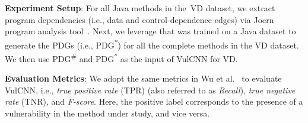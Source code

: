 {\bf Experiment Setup}: For all Java methods in the~VD dataset, we
extract program dependencies (i.e., data and control-dependence edges)
via Joern program analysis tool~\cite{joern-2014}. Next, we leverage
\tool that was trained on a Java dataset
to generate the PDGs (i.e., PDG\textsuperscript{*}) for all the
complete methods in the VD dataset. We then use
PDG\textsuperscript{\#} and PDG\textsuperscript{*} as the input of
VulCNN for VD.

{\bf Evaluation Metrics}: We adopt the same metrics in Wu et
al.~\cite{wu2022vulcnn} to evaluate VulCNN, i.e., \textit{true
  positive rate} (TPR) (also referred to as \textit{Recall}),
\textit{true negative rate} (TNR), and \textit{F-score}. Here, the
positive label corresponds to the presence of a vulnerability in the
method under study, and vice versa.



